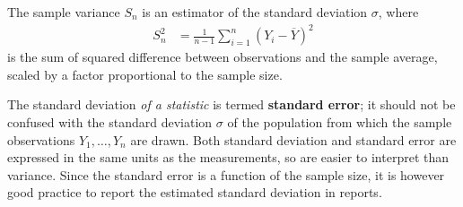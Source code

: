 \documentclass[
  11pt,
  letterpaper,
]{scrbook}
\theoremstyle{definition}
\theoremstyle{definition}
\theoremstyle{remark}
\begin{document}
The sample variance \(S_n\) is an estimator of the standard deviation
\(\sigma\), where \begin{align*}
S^2_n &= \frac{1}{n-1} \sum_{i=1}^n (Y_i-\overline{Y})^2
\end{align*} is the sum of squared difference between observations and
the sample average, scaled by a factor proportional to the sample size.

The standard deviation \emph{of a statistic} is termed \textbf{standard
error}; it should not be confused with the standard deviation \(\sigma\)
of the population from which the sample observations
\(Y_1, \ldots, Y_n\) are drawn. Both standard deviation and standard
error are expressed in the same units as the measurements, so are easier
to interpret than variance. Since the standard error is a function of
the sample size, it is however good practice to report the estimated
standard deviation in reports.
\end{document}
